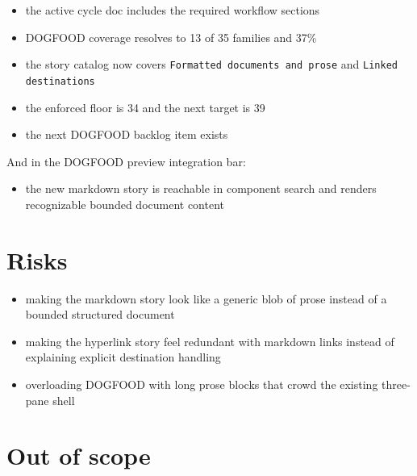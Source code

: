 \begin{itemize}
\tightlist
\item
  the active cycle doc includes the required workflow sections
\item
  DOGFOOD coverage resolves to 13 of 35 families and 37\%
\item
  the story catalog now covers \texttt{F\allowbreak{}o\allowbreak{}r\allowbreak{}m\allowbreak{}a\allowbreak{}t\allowbreak{}t\allowbreak{}e\allowbreak{}d\allowbreak{} \allowbreak{}d\allowbreak{}o\allowbreak{}c\allowbreak{}u\allowbreak{}m\allowbreak{}e\allowbreak{}n\allowbreak{}t\allowbreak{}s\allowbreak{} \allowbreak{}a\allowbreak{}n\allowbreak{}d\allowbreak{} \allowbreak{}p\allowbreak{}r\allowbreak{}o\allowbreak{}s\allowbreak{}e} and \texttt{L\allowbreak{}i\allowbreak{}n\allowbreak{}k\allowbreak{}e\allowbreak{}d\allowbreak{} \allowbreak{}d\allowbreak{}e\allowbreak{}s\allowbreak{}t\allowbreak{}i\allowbreak{}n\allowbreak{}a\allowbreak{}t\allowbreak{}i\allowbreak{}o\allowbreak{}n\allowbreak{}s}
\item
  the enforced floor is 34 and the next target is 39
\item
  the next DOGFOOD backlog item exists
\end{itemize}

And in the DOGFOOD preview integration bar:

\begin{itemize}
\tightlist
\item
  the new markdown story is reachable in component search and renders recognizable bounded document content
\end{itemize}

\section{Risks}\label{record-070-risks}

\begin{itemize}
\tightlist
\item
  making the markdown story look like a generic blob of prose instead of a bounded structured document
\item
  making the hyperlink story feel redundant with markdown links instead of explaining explicit destination handling
\item
  overloading DOGFOOD with long prose blocks that crowd the existing three-pane shell
\end{itemize}

\section{Out of scope}\label{record-070-out-of-scope}

